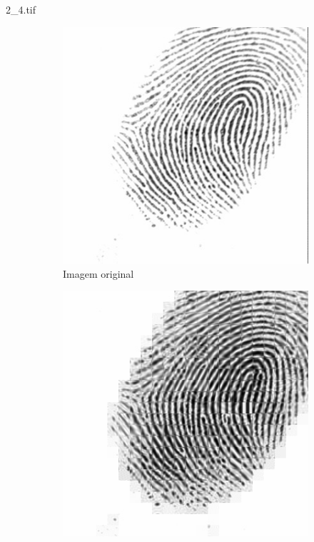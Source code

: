 \documentclass{beamer}
\begin{document}
    \begin{frame}{2\_4.tif}
        \begin{figure}
            \centering
            \begin{subfigure}[!ht]{0.32\textwidth}
                \includegraphics[width=\columnwidth]{Fingerprints/2_4.jpg}
                \caption{Imagem original}
            \end{subfigure}
            \begin{subfigure}[!ht]{0.32\textwidth}
                \includegraphics[width=\columnwidth]{Fingerprints/2_4_intermediate.jpg}

\end{subfigure}
\end{figure}
\end{frame}
\end{document}
